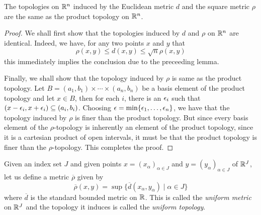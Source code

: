 \begin{theorem}
    The topologies on $\mathbb{R}^n$ induced by the Euclidean metric $d$ and the square metric $\rho$ are the same as the product topology on $\mathbb{R}^n$.
\end{theorem}
\begin{proof}
    We shall first show that the topologies induced by $d$ and $\rho$ on $\mathbb{R}^n$ are identical. Indeed, we have, for any two points $x$ and $y$ that 
    \begin{equation*}
        \rho(x,y)\le d(x,y)\le\sqrt{n}\rho(x,y)
    \end{equation*}
    this immediately implies the conclusion due to the preceeding lemma.

    Finally, we shall show that the topology induced by $\rho$ is same as the product topology. Let $B = (a_1,b_1)\times\cdots\times(a_n,b_n)$ be a basis element of the product topology and let $x\in B$, then for each $i$, there is an $\epsilon_i$ such that $(x-\epsilon_i,x+\epsilon_i)\subseteq(a_i,b_i)$. Choosing $\epsilon = \min\{\epsilon_1,\ldots,\epsilon_n\}$, we have that the topology induced by $\rho$ is finer than the product topology. But since every basis element of the $\rho$-topology is inherently an element of the product topology, since it is a cartesian product of open intervals, it must be that the product topology is finer than the $\rho$-topology. This completes the proof.
\end{proof}

\begin{definition}
    Given an index set $J$ and given points $x = (x_\alpha)_{\alpha\in J}$ and $y = (y_\alpha)_{\alpha\in J}$ of $\mathbb{R}^J$, let us define a metric $\overline{\rho}$ given by 
    \begin{equation*}
        \overline{\rho}(x,y) = \sup\{\overline{d}(x_\alpha, y_\alpha)\mid \alpha\in J\}
    \end{equation*}
    where $\overline{d}$ is the standard bounded metric on $\mathbb{R}$. This is called the \textit{uniform metric} on $\mathbb{R}^J$ and the topology it induces is called the \textit{uniform topology}.
\end{definition}


